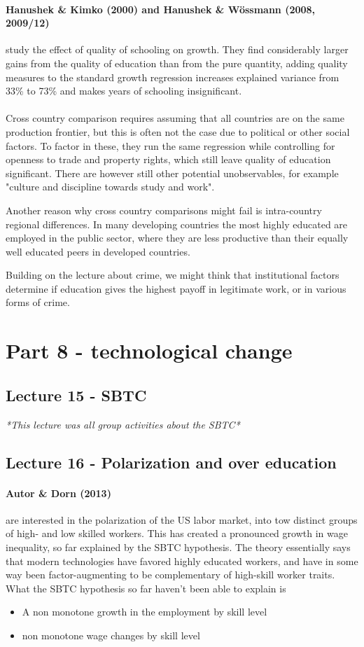 \documentclass[12pt, a4paper]{article}
\begin{document}
\begin{multicols}{2}
\paragraph{Hanushek \& Kimko (2000) and Hanushek \& Wössmann (2008, 2009/12)} study the effect of quality of schooling on growth. They find considerably larger gains from the quality of education than from the pure quantity, adding quality measures to the standard growth regression increases explained variance from 33\% to 73\% and makes years of schooling insignificant.
\\ \\
Cross country comparison requires assuming that all countries are on the same production frontier, but this is often not the case due to political or other social factors. To factor in these, they run the same regression while controlling for openness to trade and property rights, which still leave quality of education significant. There are however still other potential unobservables, for example "culture and discipline towards study and work".

Another reason why cross country comparisons might fail is intra-country regional differences. In many developing countries the most highly educated are employed in the public sector, where they are less productive than their equally well educated peers in developed countries.

Building on the lecture about crime, we might think that institutional factors determine if education gives the highest payoff in legitimate work, or in various forms of crime.
\section{Part 8 - technological change}
\subsection{Lecture 15 - SBTC}
\textit{*This lecture was all group activities about the SBTC*}

\subsection{Lecture 16 - Polarization and over education}
\paragraph{Autor \& Dorn (2013)} are interested in the polarization of the US labor market, into tow distinct groups of high- and low skilled workers. This has created a pronounced growth in wage inequality, so far explained by the SBTC hypothesis. The theory essentially says that modern technologies have favored highly educated workers, and have in some way been factor-augmenting to be complementary of high-skill worker traits. What the SBTC hypothesis so far haven't been able to explain is
\begin{itemize}
\item A non monotone growth in the employment by skill level
\item non monotone wage changes by skill level
\end{itemize}


\end{multicols}
\end{document}
